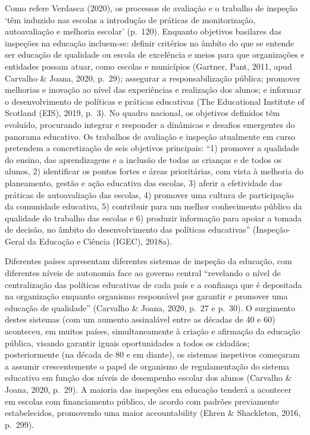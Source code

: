 \documentclass[
]{book}
\begin{document}
Como refere Verdasca (2020), os processos de avaliação e o trabalho de inspeção `têm induzido nas escolas a introdução de práticas de monitorização, autoavaliação e melhoria escolar' (p.~120). Enquanto objetivos basilares das inspeções na educação incluem-se: definir critérios no âmbito do que se entende ser educação de qualidade ou escola de excelência e meios para que organizações e entidades possam atuar, como escolas e municípios (Gartner, Pant, 2011, apud Carvalho \& Joana, 2020, p.~29); assegurar a responsabilização pública; promover melhorias e inovação ao nível das experiências e realização dos alunos; e informar o desenvolvimento de políticas e práticas educativas (The Educational Institute of Scotland (EIS), 2019, p.~3). No quadro nacional, os objetivos definidos têm evoluído, procurando integrar e responder a dinâmicas e desafios emergentes do panorama educativo. Os trabalhos de avaliação e inspeção atualmente em curso pretendem a concretização de seis objetivos principais: ``1) promover a qualidade do ensino, das aprendizagens e a inclusão de todas as crianças e de todos os alunos, 2) identificar os pontos fortes e áreas prioritárias, com vista à melhoria do planeamento, gestão e ação educativa das escolas, 3) aferir a efetividade das práticas de autoavaliação das escolas, 4) promover uma cultura de participação da comunidade educativa, 5) contribuir para um melhor conhecimento público da qualidade do trabalho das escolas e 6) produzir informação para apoiar a tomada de decisão, no âmbito do desenvolvimento das políticas educativas'' (Inspeção-Geral da Educação e Ciência (IGEC), 2018a).

Diferentes países apresentam diferentes sistemas de inspeção da educação, com diferentes níveis de autonomia face ao governo central ``revelando o nível de centralização das políticas educativas de cada país e a confiança que é depositada na organização enquanto organismo responsável por garantir e promover uma educação de qualidade'' (Carvalho \& Joana, 2020, p.~27 e p.~30). O surgimento destes sistemas (com um aumento assinalável entre as décadas de 40 e 60) aconteceu, em muitos países, simultaneamente à criação e afirmação da educação pública, visando garantir iguais oportunidades a todos os cidadãos; posteriormente (na década de 80 e em diante), os sistemas inspetivos começaram a assumir crescentemente o papel de organismo de regulamentação do sistema educativo em função dos níveis de desempenho escolar dos alunos (Carvalho \& Joana, 2020, p.~29). A maioria das inspeções em educação tenderá a acontecer em escolas com financiamento público, de acordo com padrões previamente estabelecidos, promovendo uma maior accountability (Ehren \& Shackleton, 2016, p.~299).
\end{document}
